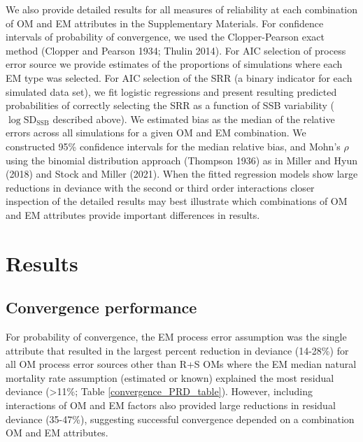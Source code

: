 \documentclass[
  12pt,
]{article}
\begin{document}
We also provide detailed results for all measures of reliability at each
combination of OM and EM attributes in the Supplementary Materials. For
confidence intervals of probability of convergence, we used the
Clopper-Pearson exact method (Clopper and Pearson 1934; Thulin 2014).
For AIC selection of process error source we provide estimates of the
proportions of simulations where each EM type was selected. For AIC
selection of the SRR (a binary indicator for each simulated data set),
we fit logistic regressions and present resulting predicted
probabilities of correctly selecting the SRR as a function of SSB
variability (\(\log \text{SD}_{\text{SSB}}\) described above). We
estimated bias as the median of the relative errors across all
simulations for a given OM and EM combination. We constructed 95\%
confidence intervals for the median relative bias, and Mohn's \(\rho\)
using the binomial distribution approach (Thompson 1936) as in Miller
and Hyun (2018) and Stock and Miller (2021). When the fitted regression
models show large reductions in deviance with the second or third order
interactions closer inspection of the detailed results may best
illustrate which combinations of OM and EM attributes provide important
differences in results.

\section*{Results}\label{results}

\subsection*{Convergence performance}\label{convergence-performance}

For probability of convergence, the EM process error assumption was the
single attribute that resulted in the largest percent reduction in
deviance (14-28\%) for all OM process error sources other than R+S OMs
where the EM median natural mortality rate assumption (estimated or
known) explained the most residual deviance (\textgreater11\%; Table
\ref{convergence_PRD_table}). However, including interactions of OM and
EM factors also provided large reductions in residual deviance
(35-47\%), suggesting successful convergence depended on a combination
OM and EM attributes.
\end{document}
